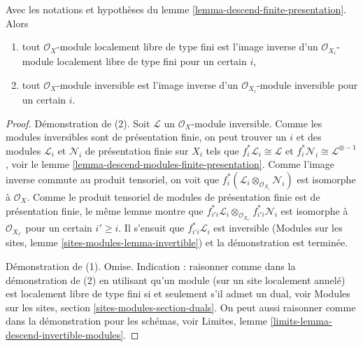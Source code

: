 \begin{lemma}
\label{lemma-descend-invertible-modules}
Avec les notations et hypothèses du
lemme \ref{lemma-descend-finite-presentation}. Alors
\begin{enumerate}
\item tout $\mathcal{O}_X$-module localement libre de type fini est l'image inverse
d'un $\mathcal{O}_{X_i}$-module localement libre de type fini pour un certain $i$,
\item tout $\mathcal{O}_X$-module inversible est l'image inverse d'un
$\mathcal{O}_{X_i}$-module inversible pour un certain $i$.
\end{enumerate}
\end{lemma}

\begin{proof}
Démonstration de (2).
Soit $\mathcal{L}$ un $\mathcal{O}_X$-module inversible. Comme les
modules inversibles sont de présentation finie, on peut trouver un $i$
et des modules $\mathcal{L}_i$ et $\mathcal{N}_i$ de présentation finie
sur $X_i$ tels que $f_i^*\mathcal{L}_i \cong \mathcal{L}$ et
$f_i^*\mathcal{N}_i \cong \mathcal{L}^{\otimes -1}$, voir le
lemme \ref{lemma-descend-modules-finite-presentation}.
Comme l'image inverse commute au produit tensoriel, on voit que
$f_i^*(\mathcal{L}_i \otimes_{\mathcal{O}_{X_i}} \mathcal{N}_i)$
est isomorphe à $\mathcal{O}_X$. Comme le produit tensoriel de
modules de présentation finie est de présentation finie, le même
lemme montre que
$f_{i'i}^*\mathcal{L}_i
\otimes_{\mathcal{O}_{X_{i'}}} f_{i'i}^*\mathcal{N}_i$
est isomorphe à $\mathcal{O}_{X_{i'}}$ pour un certain $i' \geq i$.
Il s'ensuit que $f_{i'i}^*\mathcal{L}_i$ est inversible
(Modules sur les sites, lemme \ref{sites-modules-lemma-invertible})
et la démonstration est terminée.

\medskip\noindent
Démonstration de (1). Omise. Indication : raisonner comme dans la démonstration de (2)
en utilisant qu'un module (sur un site localement annelé) est localement libre
de type fini si et seulement s'il admet un dual, voir
Modules sur les sites, section \ref{sites-modules-section-duals}.
On peut aussi raisonner comme dans la démonstration pour les schémas, voir
Limites, lemme \ref{limits-lemma-descend-invertible-modules}.
\end{proof}














